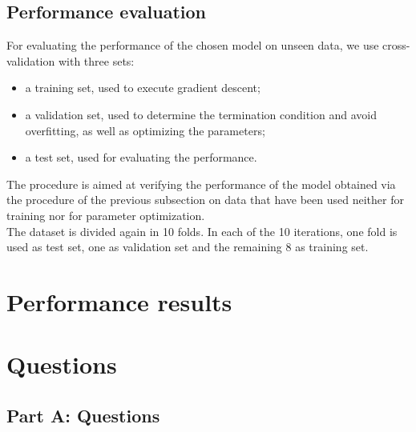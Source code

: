 \documentclass{article}
\begin{document}
\subsection{Performance evaluation}
For evaluating the performance of the chosen model on unseen data, we use cross-validation with three sets:
\begin{itemize}
	\item a training set, used to execute gradient descent;
	\item a validation set, used to determine the termination condition and avoid overfitting, as well as optimizing the parameters;
	\item a test set, used for evaluating the performance.
\end{itemize}
The procedure is aimed at verifying the performance of the model obtained via the procedure of the previous subsection on data that have been used neither for training nor for parameter optimization.\\
The dataset is divided again in 10 folds. In each of the 10 iterations, one fold is used as test set, one as validation set and the remaining 8 as training set.

\section{Performance results}


\section{Questions}
\subsection{Part A: Questions}
\end{document}
